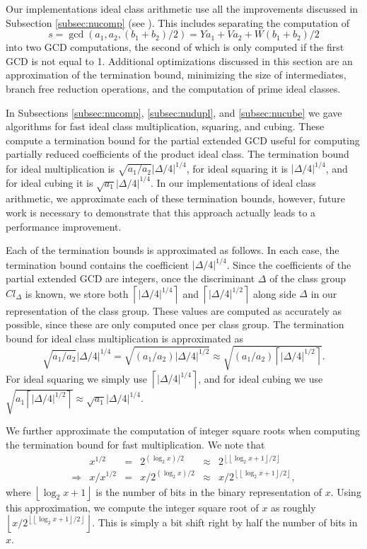\documentclass{ucalgthes1}
\theoremstyle{definition}
\newcommand{\floor}[1]{\left\lfloor #1 \right\rfloor}
\newcommand{\ceil}[1]{\left\lceil #1 \right\rceil}
\begin{document}
Our implementations ideal class arithmetic use all the improvements discussed in Subsection \ref{subsec:nucomp} (see \cite[Algorithm~6]{Imbert2010}).  This includes separating the computation of
\[
s = \gcd(a_1, a_2, (b_1+b_2)/2) = Ya_1 + Va_2 + W(b_1+b_2)/2
\]
into two GCD computations, the second of which is only computed if the first GCD is not equal to 1.  Additional optimizations discussed in this section are an approximation of the termination bound, minimizing the size of intermediates, branch free reduction operations, and the computation of prime ideal classes.

In Subsections \ref{subsec:nucomp}, \ref{subsec:nudupl}, and \ref{subsec:nucube} we gave algorithms for fast ideal class multiplication, squaring, and cubing.  These compute a termination bound for the partial extended GCD useful for computing partially reduced coefficients of the product ideal class.  The termination bound for ideal multiplication is $\sqrt{a_1/a_2}|\Delta/4|^{1/4}$, for ideal squaring it is $|\Delta/4|^{1/4}$, and for ideal cubing it is $\sqrt{a_1}|\Delta/4|^{1/4}$.  In our implementations of ideal class arithmetic, we approximate each of these termination bounds, however, future work is necessary to demonstrate that this approach actually leads to a performance improvement.

Each of the termination bounds is approximated as follows.  In each case, the termination bound contains the coefficient $|\Delta/4|^{1/4}$.  Since the coefficients of the partial extended GCD are integers, once the discriminant $\Delta$ of the class group $Cl_\Delta$ is known, we store both $\ceil{|\Delta/4|^{1/4}}$ and $\ceil{|\Delta/4|^{1/2}}$ along side $\Delta$ in our representation of the class group.  These values are computed as accurately as possible, since these are only computed once per class group.  The termination bound for ideal class multiplication is approximated as
\[
\sqrt{a_1/a_2}|\Delta/4|^{1/4} = \sqrt{(a_1/a_2) |\Delta/4|^{1/2}} \approx \sqrt{(a_1/a_2) \ceil{|\Delta/4|^{1/2}}}.
\]
For ideal squaring we simply use $\ceil{|\Delta/4|^{1/4}}$, and for ideal cubing we use $\sqrt{a_1\ceil{|\Delta/4|^{1/2}}} \approx \sqrt{a_1}|\Delta/4|^{1/4}$.  

We further approximate the computation of integer square roots when computing the termination bound for fast multiplication.  We note that 
\begin{equation*}
\begin{array}{rrlrlr}
	& x^{1/2} &=& 2^{(\log_2x)/2} &\approx& 2^{\floor{\floor{\log_2x+1}/2}} \\
	\Rightarrow & x / x^{1/2} &=& x / 2^{(\log_2x)/2} &\approx& x / 2^{\floor{\floor{\log_2x+1}/2}},
\end{array}
\end{equation*}
where $\floor{\log_2x+1}$ is the number of bits in the binary representation of $x$.  Using this approximation, we compute the integer square root of $x$ as roughly $\floor{x / 2^{\floor{\floor{\log_2x+1}/2}}}$.  This is simply a bit shift right by half the number of bits in $x$.
\end{document}

